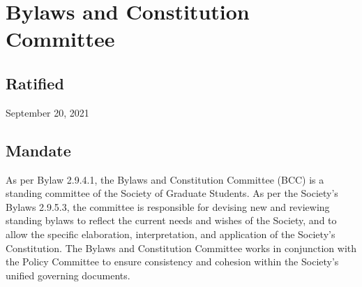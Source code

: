 \section{Bylaws and Constitution Committee}

\subsection{Ratified}
September 20, 2021

\subsection{Mandate}
As per Bylaw 2.9.4.1, the Bylaws and Constitution Committee (BCC) is a standing committee of the Society of Graduate Students. As per the Society's Bylaws 2.9.5.3, the committee is responsible for devising new and reviewing standing bylaws to reflect the current needs and wishes of the Society, and to allow the specific elaboration, interpretation, and application of the Society's Constitution. The Bylaws and Constitution Committee works in conjunction with the Policy Committee to ensure consistency and cohesion within the Society's unified governing documents.

